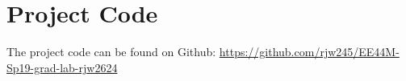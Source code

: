\appendix
\chapter{Project Code}

The project code can be found on Github:
\url{https://github.com/rjw245/EE44M-Sp19-grad-lab-rjw2624}

